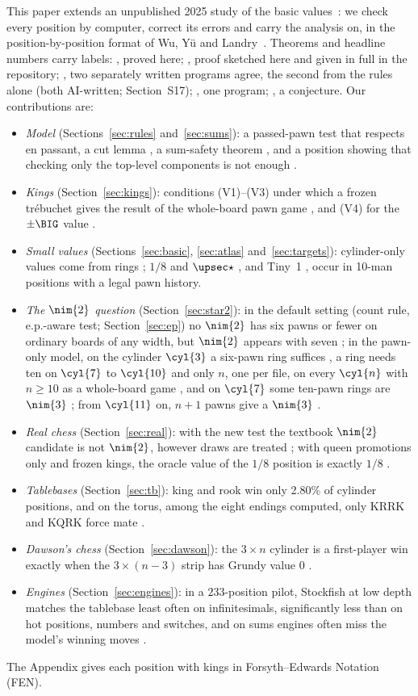 This paper extends an unpublished 2025 study of the basic values\bytheauthor~\cite{Study2025}: we check
every position by computer, correct its errors and carry the analysis on, in the position-by-position format
of Wu, Y\"u and Landry~\cite{WuYuLandry2010}. Theorems and headline numbers
carry labels: , proved here; , proof sketched here and given in full in the
repository; , two separately written programs agree,
the second from the rules alone (both AI-written; Section~S17); , one program; , a conjecture. Our contributions
are:
\begin{itemize}
\item \emph{Model} (Sections~\ref{sec:rules} and~\ref{sec:sums}): a passed-pawn test that respects en passant,
  a cut lemma , a sum-safety theorem , and a position showing that checking only the
  top-level components is not enough .
\item \emph{Kings} (Section~\ref{sec:kings}): conditions (V1)--(V3) under which a frozen tr\'ebuchet gives the
  result of the whole-board pawn game , and (V4) for the $\pm\BIG$ value .
\item \emph{Small values} (Sections~\ref{sec:basic}, \ref{sec:atlas} and~\ref{sec:targets}): cylinder-only values
  come from rings ; $1/8$ and $\upsec\star$ , and Tiny~1 , occur in 10-man positions
  with a legal pawn history.
\item \emph{The $\nim{2}$ question} (Section~\ref{sec:star2}): in the default setting (count rule, e.p.-aware
  test; Section~\ref{sec:ep}) no $\nim{2}$ has six
  pawns or fewer on ordinary boards of any width, but $\nim{2}$ appears with seven
  ; in the pawn-only model, on the cylinder $\cyl{3}$ a six-pawn ring suffices , a ring needs ten on $\cyl{7}$ to $\cyl{10}$
   and only $n$, one per file, on every $\cyl{n}$ with $n\ge10$ as a whole-board game , and on $\cyl{7}$ some ten-pawn
  rings are $\nim{3}$ ; from $\cyl{11}$ on, $n+1$ pawns give a $\nim{3}$ .
\item \emph{Real chess} (Section~\ref{sec:real}): with the new test the textbook $\nim{2}$ candidate is not
  $\nim{2}$, however draws are treated ; with queen promotions only and frozen kings, the oracle value of the $1/8$ position
  is exactly $1/8$ .
\item \emph{Tablebases} (Section~\ref{sec:tb}): king and rook win only 2.80\% of cylinder positions, and on the
  torus, among the eight endings computed, only KRRK and KQRK force mate .
\item \emph{Dawson's chess} (Section~\ref{sec:dawson}): the $3\times n$ cylinder is a first-player win exactly
  when the $3\times(n-3)$ strip has Grundy value $0$ .
\item \emph{Engines} (Section~\ref{sec:engines}): in a $233$-position pilot, Stockfish at low depth matches the tablebase least often on infinitesimals, significantly less than on hot positions, numbers and switches, and on sums
  engines often miss the model's winning moves .
\end{itemize}

The Appendix gives each position with kings in Forsyth--Edwards Notation (FEN).
